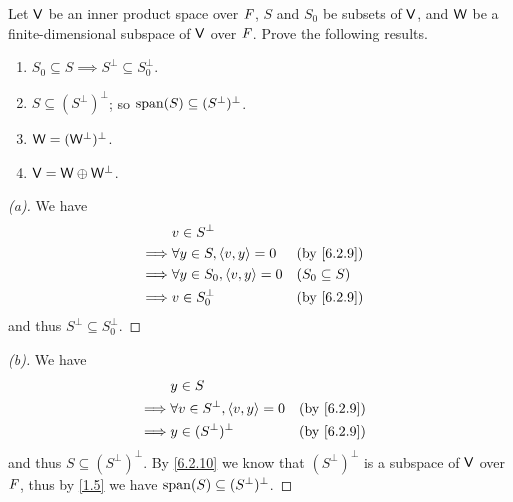 \begin{ex}\label{ex:6.2.13}
	Let \(\mathsf{V}\) be an inner product space over \(\mathit{F}\), \(S\) and \(S_0\) be subsets of \(\mathsf{V}\), and \(\mathsf{W}\) be a finite-dimensional subspace of \(\mathsf{V}\) over \(\mathit{F}\).
	Prove the following results.
	\begin{enumerate}
		\item \(S_0 \subseteq S \implies S^{\perp} \subseteq S_0^{\perp}\).
		\item \(S \subseteq (S^{\perp})^{\perp}\);
		      so \(\spn{S} \subseteq (S^{\perp})^{\perp}\).
		\item \(\mathsf{W} = (\mathsf{W}^{\perp})^{\perp}\).
		\item \(\mathsf{V} = \mathsf{W} \oplus \mathsf{W}^{\perp}\).
	\end{enumerate}
\end{ex}

\begin{proof}[(a)]
	We have
	\begin{align*}
		         & v \in S^{\perp}                                          \\
		\implies & \forall y \in S, \inn{v, y} = 0   &  & \by{6.2.9}        \\
		\implies & \forall y \in S_0, \inn{v, y} = 0 &  & (S_0 \subseteq S) \\
		\implies & v \in S_0^{\perp}                 &  & \by{6.2.9}
	\end{align*}
	and thus \(S^{\perp} \subseteq S_0^{\perp}\).
\end{proof}

\begin{proof}[(b)]
	We have
	\begin{align*}
		         & y \in S                                                 \\
		\implies & \forall v \in S^{\perp}, \inn{v, y} = 0 &  & \by{6.2.9} \\
		\implies & y \in (S^{\perp})^{\perp}               &  & \by{6.2.9}
	\end{align*}
	and thus \(S \subseteq (S^{\perp})^{\perp}\).
	By \cref{6.2.10} we know that \((S^{\perp})^{\perp}\) is a subspace of \(\mathsf{V}\) over \(\mathit{F}\), thus by \cref{1.5} we have \(\spn{S} \subseteq (S^{\perp})^{\perp}\).
\end{proof}


